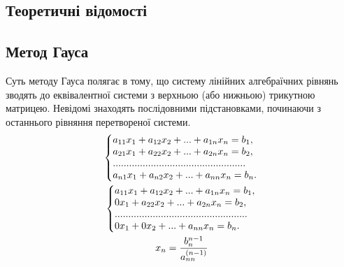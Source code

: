 \documentclass{article}
\begin{document}
\begin{large}
		\section*{Теоретичні відомості}
		\subsection*{Метод Гауса}
		Суть методу Гауса полягає в тому, що систему лінійних алгебраїчних рівнянь зводять до
		еквівалентної системи з верхньою (або нижньою) трикутною матрицею.
		Невідомі знаходять послідовними підстановками, починаючи з останнього
		рівняння перетвореної системи.
		\begin{gather}
			\left\{\begin{array}{@{}l@{}}
				a_{11}x_1 + a_{12}x_2 + ... + a_{1n}x_n = b_{1},\\\nonumber
				a_{21}x_1 + a_{22}x_2 + ... + a_{2n}x_n = b_{2},\\\nonumber
				.................................................\\\nonumber
				a_{n1}x_1 + a_{n2}x_2 + ... + a_{nn}x_n = b_{n}.\nonumber
			\end{array}\right.\,\\
			\left\{\begin{array}{@{}l@{}}
				a_{11}x_1 + a_{12}x_2 + ... + a_{1n}x_n = b_{1},\\\nonumber
				0x_1 + a_{22}x_2 + ... + a_{2n}x_n = b_{2},\\\nonumber
				.................................................\\\nonumber
				0x_1 + 0x_2 + ... + a_{nn}x_n = b_{n}.\nonumber
			\end{array}\right.\,\\
		x_n=\frac{b_n^{n-1}}{a_{nn}^{(n-1)}}\nonumber
		\end{gather}

\end{large}
\end{document}

